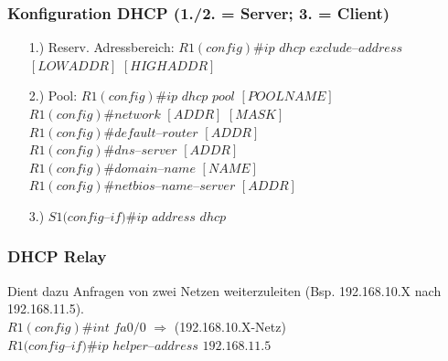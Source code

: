 \documentclass[landscape,twocolumn,a4paper]{article}
\newcommand{\Ra}{\Rightarrow}
\begin{document}
\begin{footnotesize}
\subsubsection{Konfiguration DHCP (1./2. = Server; 3. = Client)}
\begin{itemize}
	\item[1.)] Reserv. Adressbereich:
	$R1(config)\#ip$ $dhcp$ $exclude$--$address$ $[LOW ADDR]$ $[HIGH ADDR]$
	\item[2.)] Pool: $R1(config)\#ip$ $dhcp$ $pool$ $[POOLNAME]$\\
	$R1(config)\#network$ $[ADDR]$ $[MASK]$\\
	$R1(config)\#default$--$router$ $[ADDR]$\\
	$R1(config)\#dns$--$server$ $[ADDR]$\\
	$R1(config)\#domain$--$name$ $[NAME]$\\
	$R1(config)\#netbios$--$name$--$server$ $[ADDR]$
	\item[3.)] $S1(config$--$if)\#ip$ $address$ $dhcp$
\end{itemize}
\subsubsection{DHCP Relay}
Dient dazu Anfragen von zwei Netzen weiterzuleiten (Bsp. 192.168.10.X nach 192.168.11.5).\\
$R1(config)\#int$ $fa0/0$ $\Ra$ (192.168.10.X-Netz)\\
$R1(config$--$if)\#ip$ $helper$--$address$ $192.168.11.5$


\end{footnotesize}
\end{document}
